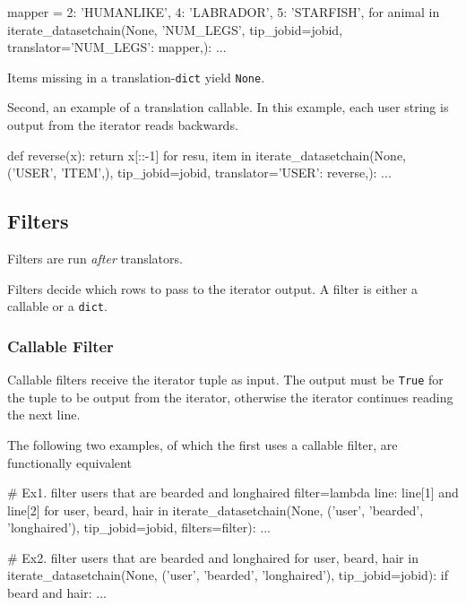 \begin{python}
mapper = {2: 'HUMANLIKE', 4: 'LABRADOR', 5: 'STARFISH',}
for animal in iterate_datasetchain(None, 'NUM_LEGS', tip_jobid=jobid,
                                     translator={'NUM_LEGS': mapper,}):
    ...
\end{python}
Items missing in a translation-\texttt{dict} yield \texttt{None}.

Second, an example of a translation callable.  In this example, each
user string is output from the iterator reads backwards.

\begin{python}
def reverse(x):
    return x[::-1]
for resu, item in iterate_datasetchain(None, ('USER', 'ITEM',), tip_jobid=jobid,
                                       translator={'USER': reverse,}):
    ...
\end{python}



\subsection{Filters}

Filters are run \emph{after} translators.

Filters decide which rows to pass to the iterator output.  A filter is
either a callable or a \texttt{dict}.


\subsubsection*{Callable Filter}

Callable filters receive the iterator tuple as input.  The output must
be \texttt{True} for the tuple to be output from the iterator,
otherwise the iterator continues reading the next line.

The following two examples, of which the first uses a callable filter,
are functionally equivalent

\begin{python}
# Ex1.  filter users that are bearded and longhaired
filter=lambda line: line[1] and line[2]
for user, beard, hair in iterate_datasetchain(None, ('user', 'bearded', 'longhaired'),
                                       tip_jobid=jobid, filters=filter):
    ...

# Ex2.  filter users that are bearded and longhaired
for user, beard, hair in iterate_datasetchain(None, ('user', 'bearded', 'longhaired'),
                                       tip_jobid=jobid):
    if beard and hair:
        ...
\end{python}




